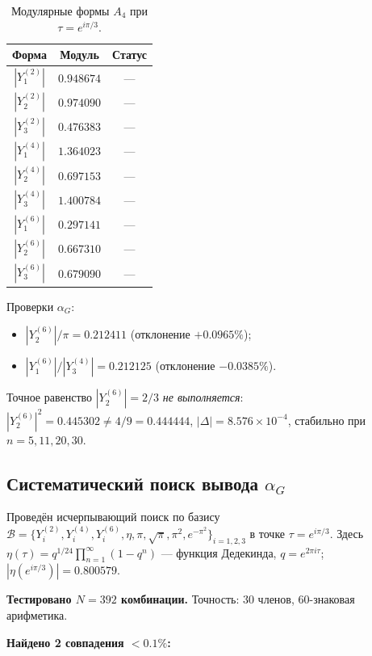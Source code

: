 \documentclass[12pt,a4paper]{article}
\numberwithin{equation}{section}
\begin{document}
\begin{table}[H]
\centering
\caption{Модулярные формы $A_4$ при $\tau = e^{i\pi/3}$.}
\label{tab:Yforms}
\begin{tabular}{ccc}
\toprule
Форма & Модуль & Статус \\
\midrule
$|Y^{(2)}_1|$ & $0.948674$ & --- \\
$|Y^{(2)}_2|$ & $0.974090$ & --- \\
$|Y^{(2)}_3|$ & $0.476383$ & --- \\
$|Y^{(4)}_1|$ & $1.364023$ & --- \\
$|Y^{(4)}_2|$ & $0.697153$ & --- \\
$|Y^{(4)}_3|$ & $1.400784$ & --- \\
$|Y^{(6)}_1|$ & $0.297141$ & --- \\
$|Y^{(6)}_2|$ & $0.667310$ & --- \\
$|Y^{(6)}_3|$ & $0.679090$ & --- \\
\bottomrule
\end{tabular}
\end{table}

Проверки $\alpha_G$:
\begin{itemize}[leftmargin=1.5em,itemsep=0.05em]
\item $|Y^{(6)}_2|/\pi = 0.212411$ (отклонение $+0.0965\%$);
\item $|Y^{(6)}_1|/|Y^{(4)}_3| = 0.212125$ (отклонение $-0.0385\%$).
\end{itemize}

Точное равенство $|Y^{(6)}_2| = 2/3$ \emph{не выполняется}:
$|Y^{(6)}_2|^2 = 0.445302 \neq 4/9 = 0.444444$,
$|\Delta| = 8.576\times10^{-4}$, стабильно при $n = 5, 11, 20, 30$.

\subsection{Систематический поиск вывода $\alpha_G$}
\label{sec:alpha-search}

Проведён исчерпывающий поиск по базису
$\mathcal{B} = \{Y^{(2)}_i, Y^{(4)}_i, Y^{(6)}_i, \eta, \pi, \sqrt\pi, \pi^2, e^{-\pi^2}\}_{i=1,2,3}$
в точке $\tau = e^{i\pi/3}$.
Здесь $\eta(\tau) = q^{1/24}\prod_{n=1}^\infty (1-q^n)$ --- функция
Дедекинда, $q = e^{2\pi i\tau}$; $|\eta(e^{i\pi/3})| = 0.800579$.

\textbf{Тестировано $N = 392$ комбинации.}
Точность: 30 членов, 60-знаковая арифметика.

\textbf{Найдено 2 совпадения $<0.1\%$:}
\end{document}
